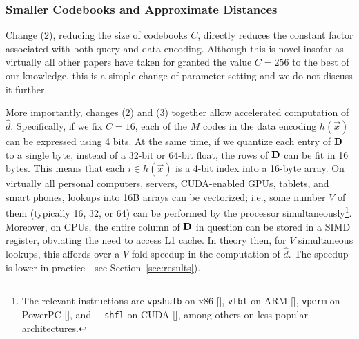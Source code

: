 



\subsubsection{Smaller Codebooks and Approximate Distances} \label{sec:boltVectorize}

Change (2), reducing the size of codebooks $C$, directly reduces the constant factor associated with both query and data encoding. Although this is novel insofar as virtually all other papers have taken for granted the value $C = 256$ to the best of our knowledge, this is a simple change of parameter setting and we do not discuss it further.

More importantly, changes (2) and (3) together allow accelerated computation of $\hat{d}$. Specifically, if we fix $C = 16$, each of the $M$ codes in the data encoding $h(\vec{x})$ can be expressed using 4 bits. At the same time, if we quantize each entry of $\mathbf{D}$ to a single byte, instead of a 32-bit or 64-bit float, the rows of $\mathbf{D}$ can be fit in 16 bytes. This means that each $i \in h(\vec{x})$ is a 4-bit index into a 16-byte array. On virtually all personal computers, servers, CUDA-enabled GPUs, tablets, and smart phones, lookups into 16B arrays can be vectorized; i.e., some number $V$ of them (typically 16, 32, or 64) can be performed by the processor simultaneously\footnote{The relevant instructions are \texttt{vpshufb} on x86 [], \texttt{vtbl} on ARM [], \texttt{vperm} on PowerPC [], and \texttt{\_\_shfl} on CUDA [], among others on less popular architectures.}. Moreover, on CPUs, the entire column of $\mathbf{D}$ in question can be stored in a SIMD register, obviating the need to access L1 cache. In theory then, for $V$ simultaneous lookups, this affords over a $V$-fold speedup in the computation of $\hat{d}$. The speedup is lower in practice---see Section~\ref{sec:results}).

